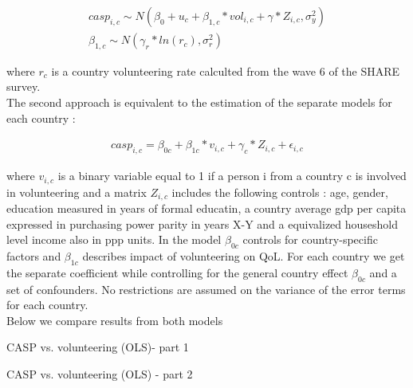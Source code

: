 \documentclass[10pt, letterpaper]{article}
\begin{document}
\begin{spacing}{1.4}
 \begin{eqnarray}
  \label{eq:casp_mlm}
	casp_{i,c}\sim N(\beta_{0}+ u_{c} +  \beta_{1,c} * vol_{i,c}+\gamma*Z_{i,c},\sigma^{2}_{y}) \\	
	\beta_{1,c} \sim N(\gamma_{r}*ln(r_{c}),\sigma^{2}_{r})
 \end{eqnarray}
 
where $r_{c}$ is a country volunteering rate calculted from the wave 6 of the SHARE survey. \\ 

The second approach is equivalent to the estimation of the separate models for each country : 
 
  \begin{eqnarray}
	casp_{i,c}= \beta_{0c}+ \beta_{1c}*v_{i,c} + \gamma_{c}*Z_{i,c} + \epsilon_{i,c}
 \end{eqnarray}

where $v_{i,c}$ is a binary variable equal to 1 if a person i from a country c is involved in  volunteering  and a matrix $Z_{i,c}$ includes the following controls : age, gender, education measured in years of formal educatin, a country average gdp per capita expressed in purchasing power parity in years X-Y and a equivalized houseshold level income also in ppp units.  In the model $\beta_{0c}$ controls for country-specific factors   and $\beta_{1c}$ describes impact of volunteering on QoL. For each country we get the separate coefficient while controlling for the general country effect $\beta_{0c}$ and a set of confounders. No restrictions are assumed on the variance of the error terms for each country. \\

Below we compare results from both models \\ 

\begin{spacing}{.9}
\begin{table}[H]
\centering 
\caption{CASP vs. volunteering (OLS)- part 1}  
\begin{scriptsize} 
	 
      \label{SepMod} 
\end{scriptsize}
\end{table}
\end{spacing}

\begin{spacing}{.9}
\begin{table}[H]
\centering 
\caption{CASP vs. volunteering (OLS) - part 2}  
\begin{scriptsize} 
	 
      \label{SepMod1} 
\end{scriptsize}
\end{table}
\end{spacing}



\end{spacing}
\end{document}
